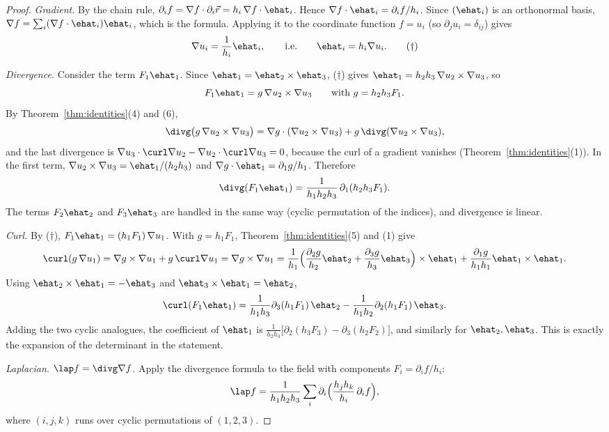 \begin{proof}
\emph{Gradient.} By the chain rule, $\partial_if=\nabla f\cdot\partial_i\vec r=h_i\,\nabla f\cdot\ehat_i$. Hence $\nabla f\cdot\ehat_i=\partial_if/h_i$. Since $(\ehat_i)$ is an orthonormal basis, $\nabla f=\sum_i(\nabla f\cdot\ehat_i)\ehat_i$, which is the formula. Applying it to the coordinate function $f=u_i$ (so $\partial_ju_i=\delta_{ij}$) gives
\[
\nabla u_i=\frac1{h_i}\ehat_i,\qquad\text{i.e.}\qquad\ehat_i=h_i\nabla u_i .\tag{$\dagger$}
\]

\emph{Divergence.} Consider the term $F_1\ehat_1$. Since $\ehat_1=\ehat_2\times\ehat_3$, ($\dagger$) gives $\ehat_1=h_2h_3\,\nabla u_2\times\nabla u_3$, so
\[
F_1\ehat_1=g\,\nabla u_2\times\nabla u_3\qquad\text{with }g=h_2h_3F_1 .
\]
By Theorem~\ref{thm:identities}(4) and (6),
\[
\divg\bigl(g\,\nabla u_2\times\nabla u_3\bigr)=\nabla g\cdot(\nabla u_2\times\nabla u_3)+g\,\divg(\nabla u_2\times\nabla u_3),
\]
and the last divergence is $\nabla u_3\cdot\curl\nabla u_2-\nabla u_2\cdot\curl\nabla u_3=0$, because the curl of a gradient vanishes (Theorem~\ref{thm:identities}(1)). In the first term, $\nabla u_2\times\nabla u_3=\ehat_1/(h_2h_3)$ and $\nabla g\cdot\ehat_1=\partial_1g/h_1$. Therefore
\[
\divg(F_1\ehat_1)=\frac1{h_1h_2h_3}\,\partial_1(h_2h_3F_1).
\]
The terms $F_2\ehat_2$ and $F_3\ehat_3$ are handled in the same way (cyclic permutation of the indices), and divergence is linear.

\emph{Curl.} By ($\dagger$), $F_1\ehat_1=(h_1F_1)\,\nabla u_1$. With $g=h_1F_1$, Theorem~\ref{thm:identities}(5) and (1) give
\[
\curl(g\,\nabla u_1)=\nabla g\times\nabla u_1+g\,\curl\nabla u_1=\nabla g\times\nabla u_1=\frac1{h_1}\Bigl(\frac{\partial_2g}{h_2}\ehat_2+\frac{\partial_3g}{h_3}\ehat_3\Bigr)\times\ehat_1+\frac{\partial_1g}{h_1h_1}\ehat_1\times\ehat_1 .
\]
Using $\ehat_2\times\ehat_1=-\ehat_3$ and $\ehat_3\times\ehat_1=\ehat_2$,
\[
\curl(F_1\ehat_1)=\frac1{h_1h_3}\partial_3(h_1F_1)\,\ehat_2-\frac1{h_1h_2}\partial_2(h_1F_1)\,\ehat_3 .
\]
Adding the two cyclic analogues, the coefficient of $\ehat_1$ is $\frac1{h_2h_3}\bigl[\partial_2(h_3F_3)-\partial_3(h_2F_2)\bigr]$, and similarly for $\ehat_2,\ehat_3$. This is exactly the expansion of the determinant in the statement.

\emph{Laplacian.} $\lap f=\divg\nabla f$. Apply the divergence formula to the field with components $F_i=\partial_if/h_i$:
\[
\lap f=\frac1{h_1h_2h_3}\sum_i\partial_i\Bigl(\frac{h_jh_k}{h_i}\,\partial_if\Bigr),
\]
where $(i,j,k)$ runs over cyclic permutations of $(1,2,3)$.
\end{proof}

